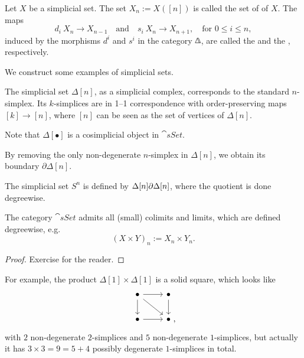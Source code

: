 Let $X$ be a simplicial set.
The set $X_n:=X([n])$ is called the set of  of $X$.
The maps 
\[ d_i\:X_n\to X_{n-1}\quad\text{and}\quad s_i\:X_n\to X_{n+1},\quad\text{for }0\leq i\leq n, \]
induced by the morphisms $d^i$ and $s^i$ in the category $\bfDelta$,
are called the  and the , respectively.

\begin{example}
    We construct some examples of simplicial sets.
    \begin{itms}
        \item The simplicial set $\Delta[n]$,
        as a simplicial complex, corresponds to the standard $n$-simplex.
        Its $k$-simplices are in 1--1 correspondence with 
        order-preserving maps $[k]\to[n]$,
        where $[n]$ can be seen as the set of vertices of $\Delta[n]$.
        \item Note that $\Delta[\bullet]$ is a cosimplicial object in $\cat{sSet}$.
        \item By removing the only non-degenerate $n$-simplex in $\Delta[n]$,
        we obtain its boundary $\partial\Delta[n]$.
        \item The simplicial set $S^n$ is defined by $\Delta[n]\/\partial\Delta[n]$,
        where the quotient is done degreewise. \varqed
    \end{itms}
\end{example}

\begin{proposition}
    The category $\cat{sSet}$ admits all (small) colimits and limits, 
    which are defined degreewise, e.g.
    \[ (X\times Y)_n:=X_n\times Y_n. \]
\end{proposition}

\begin{proof}
    Exercise for the reader.
\end{proof}

For example, the product $\Delta[1]\times\Delta[1]$ is a solid square, which looks like
\[\begin{tikzcd}
    \bullet\ar[d]\ar[r]\ar[dr] & \bullet\ar[d] \\
    \bullet\ar[r] & \bullet\rlap{\ ,}
\end{tikzcd}\]
with $2$ non-degenerate $2$-simplices and $5$ non-degenerate $1$-simplices,
but actually it has $3\times3=9=5+4$ possibly degenerate $1$-simplices in total.

